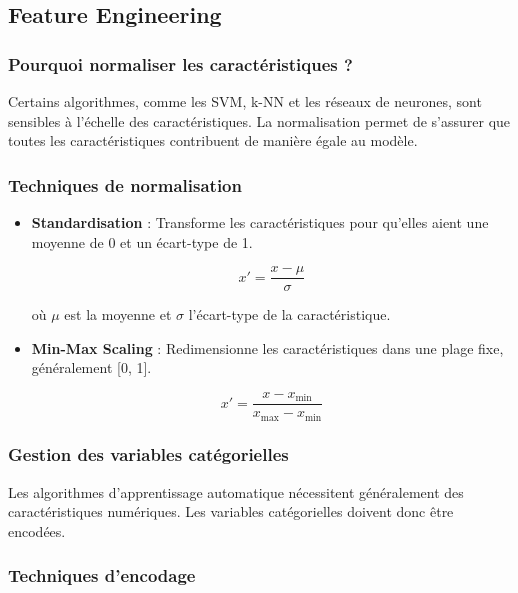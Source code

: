 \documentclass[10pt,a4paper]{article}
\begin{document}

\subsection*{Feature Engineering}

\subsubsection*{Pourquoi normaliser les caractéristiques ?}

Certains algorithmes, comme les SVM, k-NN et les réseaux de neurones, sont sensibles à l'échelle des caractéristiques. La normalisation permet de s'assurer que toutes les caractéristiques contribuent de manière égale au modèle.

\subsubsection*{Techniques de normalisation}

\begin{itemize}
    \item \textbf{Standardisation} : Transforme les caractéristiques pour qu'elles aient une moyenne de 0 et un écart-type de 1.

    \[
    x' = \frac{x - \mu}{\sigma}
    \]

    où \( \mu \) est la moyenne et \( \sigma \) l'écart-type de la caractéristique.

    \item \textbf{Min-Max Scaling} : Redimensionne les caractéristiques dans une plage fixe, généralement [0, 1].

    \[
    x' = \frac{x - x_{\text{min}}}{x_{\text{max}} - x_{\text{min}}}
    \]
\end{itemize}

\subsubsection*{Gestion des variables catégorielles}

Les algorithmes d'apprentissage automatique nécessitent généralement des caractéristiques numériques. Les variables catégorielles doivent donc être encodées.

\subsubsection*{Techniques d'encodage}
\end{document}
